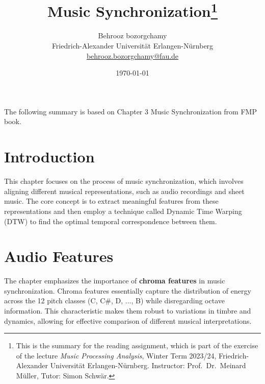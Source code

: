 \documentclass[a4paper, 9pt, twocolumn]{extarticle}
\begin{document}
\date{\normalsize \today}

\title{\vspace{-8mm}\textbf{\Large
    Music Synchronization\footnote{This is the summary for the reading assignment,
      which is part of the exercise of the lecture \emph{Music Processing Analysis}, Winter Term 2023/24,
      Friedrich-Alexander Universit\"at Erlangen-N\"urnberg.
      Instructor: Prof.\ Dr.\ Meinard M\"uller,
      Tutor: Simon Schw\"ar.
    }}}

\author{
  {
      \begin{minipage}{\textwidth}
        \center
        Behrooz bozorgchamy\\
        \small
        Friedrich-Alexander Universit\"at Erlangen-N\"urnberg
        \protect\\{} %
        \url{behrooz.bozorgchamy@fau.de}
      \end{minipage}
    }
}

\maketitle
\thispagestyle{empty}
The following summary is based on Chapter 3 Music Synchronization from FMP book\cite{Mueller21_FMP_SPRINGER}.
\section{Introduction}
\label{section:introduction}

This chapter focuses on the process of music synchronization, which
involves aligning different musical representations, such as audio
recordings and sheet music. The core concept is to extract meaningful
features from these representations and then employ a technique called
Dynamic Time Warping (DTW) to find the optimal temporal correspondence
between them.
\section{Audio Features}
The chapter emphasizes the importance of \textbf{chroma features} in music
synchronization. Chroma features essentially capture the distribution of
energy across the 12 pitch classes (C, C\#, D, ..., B) while
disregarding octave information. This characteristic makes them robust
to variations in timbre and dynamics, allowing for effective comparison
of different musical interpretations.
\end{document}
